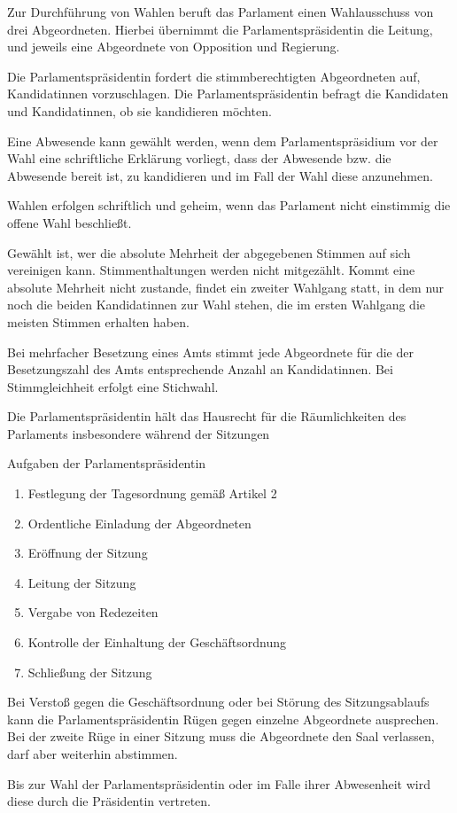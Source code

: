 \documentclass{sasbase}
\begin{document}
\begin{article}[Wahl]
\item Zur Durchführung von Wahlen beruft das Parlament einen Wahlausschuss von drei Abgeordneten. Hierbei \"{u}bernimmt die Parlamentspr\"{a}sidentin die Leitung, und jeweils eine Abgeordnete von Opposition und Regierung.
\item Die Parlamentspr\"{a}sidentin fordert die stimmberechtigten Abgeordneten auf, Kandidatinnen vorzuschlagen. Die Parlamentspr\"{a}sidentin befragt die Kandidaten und Kandidatinnen, ob sie kandidieren möchten.
\item Eine Abwesende kann gewählt werden, wenn dem Parlamentspr\"{a}sidium vor der Wahl eine schriftliche Erklärung vorliegt, dass der Abwesende bzw. die Abwesende bereit ist, zu kandidieren und im Fall der Wahl diese anzunehmen.
\item Wahlen erfolgen schriftlich und geheim, wenn das Parlament nicht einstimmig die offene Wahl beschließt.
\item Gewählt ist, wer die absolute Mehrheit der abgegebenen Stimmen auf sich vereinigen kann. Stimmenthaltungen werden nicht mitgezählt. Kommt eine absolute Mehrheit nicht zustande, findet ein zweiter Wahlgang statt, in dem nur noch die beiden Kandidatinnen zur Wahl stehen, die im ersten Wahlgang die meisten Stimmen erhalten haben.
\item Bei mehrfacher Besetzung eines Amts stimmt jede Abgeordnete für die der Besetzungszahl des Amts
    entsprechende Anzahl an Kandidatinnen. Bei Stimmgleichheit erfolgt eine Stichwahl.
\end{article}
\begin{article}[Parlamentspräsidentin]
    \item Die Parlamentspräsidentin hält das Hausrecht für die Räumlichkeiten des Parlaments
        insbesondere während der Sitzungen
    \item Aufgaben der Parlamentspräsidentin
    \begin{enumerate}
        \item Festlegung der Tagesordnung gemäß Artikel 2
        \item Ordentliche Einladung der Abgeordneten
        \item Eröffnung der Sitzung
        \item Leitung der Sitzung
        \item Vergabe von Redezeiten
        \item Kontrolle der Einhaltung der Geschäftsordnung
        \item Schließung der Sitzung
    \end{enumerate}
    \item Bei Verstoß gegen die Geschäftsordnung oder bei Störung des Sitzungsablaufs kann die
        Parlamentspräsidentin Rügen gegen einzelne Abgeordnete ausprechen. Bei der zweite Rüge
        in einer Sitzung muss die Abgeordnete den Saal verlassen, darf aber weiterhin abstimmen.
    \item Bis zur Wahl der Parlamentspräsidentin oder im Falle ihrer Abwesenheit wird diese durch
        die Präsidentin vertreten.
\end{article}
\end{document}
